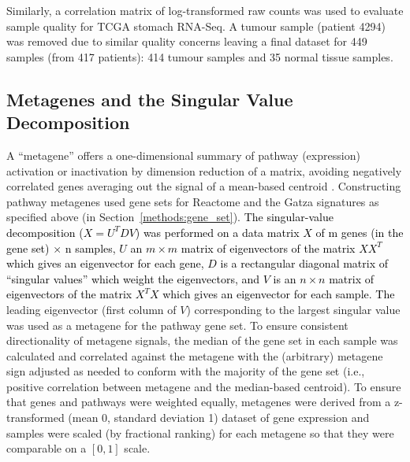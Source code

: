 Similarly, a correlation matrix of log-transformed raw counts was used to evaluate sample quality for \gls{TCGA} stomach \gls{RNA-Seq}. A tumour sample (patient 4294) was removed due to similar quality concerns leaving a final dataset for 449 samples (from 417 patients): 414 tumour samples and 35 normal tissue samples.

\subsection{Metagenes and the Singular Value Decomposition} \label{methods:metagene}
A ``\gls{metagene}'' offers a one-dimensional summary of \gls{pathway} (expression) activation or inactivation by dimension reduction of a matrix, avoiding negatively correlated genes averaging out the signal of a mean-based centroid \citep{Huang2003}. Constructing \gls{pathway} \glspl{metagene} used gene sets for Reactome and the Gatza signatures \citep{Gatza2011, Gatza2014} as specified above (in Section~\ref{methods:gene_set}). \textcolor{black}{The singular-value decomposition ($X = U^{T} D V$) was performed on a data matrix $X$ of m genes (in the gene set) $\times$ n samples, $U$ an $m \times m$ matrix of eigenvectors of the matrix $XX^{T}$ which gives an eigenvector for each gene, $D$ is a rectangular diagonal matrix of ``singular values'' which weight the eigenvectors, and $V$ is an $n \times n$ matrix of eigenvectors of the matrix $X^{T}X$ which gives an eigenvector for each sample. The} leading eigenvector (first column of $V$) corresponding to the largest singular value was used as a \gls{metagene} for the \gls{pathway} gene set. To ensure consistent directionality of \gls{metagene} signals, the median of the gene set in each sample was calculated and correlated against the \gls{metagene} with the (arbitrary) \gls{metagene} sign adjusted as needed to conform with the majority of the gene set (i.e., positive correlation between \gls{metagene} and the median-based centroid). To ensure that genes and \glspl{pathway} were weighted equally, \glspl{metagene} were derived from a z-transformed (mean 0, standard deviation 1) dataset of \gls{gene expression} and samples were scaled (by fractional ranking) for each \gls{metagene} so that they were comparable on a $[0,1]$ scale. 



